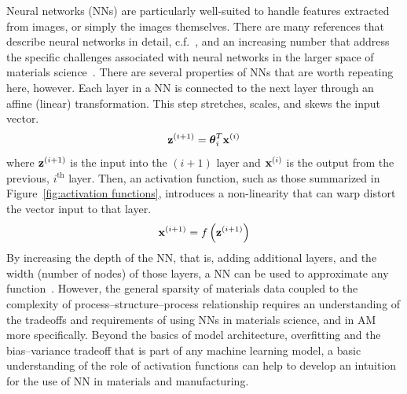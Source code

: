 Neural networks (NNs) are particularly well-suited to handle features extracted from images, or simply the images themselves. There are many references that describe neural networks in detail, c.f.~\cite{Hastie2009}, and an increasing number that address the specific challenges associated with neural networks in the larger space of materials science~\cite{Bhadeshia2009}. There are several properties of NNs that are worth repeating here, however. Each layer in a NN is connected to the next layer through an affine (linear) transformation. This step stretches, scales, and skews the input vector.
\begin{equation}
	{\bold z}^{(i+1)} = \boldsymbol \theta_i^T {\bold x}^{(i)}
\end{equation}
where ${\bold z}^{(i+1)}$ is the input into the $(i+1)$ layer and ${\bold x}^{(i)}$ is the output from the previous, $i^\textrm{th}$ layer. Then, an activation function, such as those summarized in Figure~\ref{fig:activation functions}, introduces a non-linearity that can warp distort the vector input to that layer.
\begin{equation}
	{\bold x}^{(i+1)} = f \left( {\bold z}^{(i+1)} \right)
\end{equation}
By increasing the depth of the NN, that is, adding additional layers, and the width (number of nodes) of those layers, a NN can be used to approximate any function~\cite{Hornik1989}. However, the general sparsity of materials data coupled to the complexity of process--structure--process relationship requires an understanding of the tradeoffs and requirements of using NNs in materials science, and in AM more specifically. Beyond the basics of model architecture, overfitting and the bias--variance tradeoff that is part of any machine learning model, a basic understanding of the role of activation functions can help to develop an intuition for the use of NN in materials and manufacturing.

